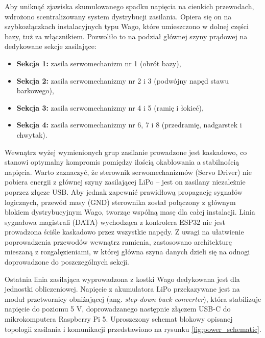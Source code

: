\documentclass[11pt]{extreport}
\begin{document}
Aby uniknąć zjawiska skumulowanego spadku napięcia na cienkich przewodach, wdrożono scentralizowany system dystrybucji zasilania. Opiera się on na szybkozłączkach instalacyjnych typu Wago, które umieszczono w dolnej części bazy, tuż za włącznikiem. Pozwoliło to na podział głównej szyny prądowej na dedykowane sekcje zasilające:
\begin{itemize}
    \item \textbf{Sekcja 1:} zasila serwomechanizm nr 1 (obrót bazy),
    \item \textbf{Sekcja 2:} zasila serwomechanizmy nr 2 i 3 (podwójny napęd stawu barkowego),
    \item \textbf{Sekcja 3:} zasila serwomechanizmy nr 4 i 5 (ramię i łokieć),
    \item \textbf{Sekcja 4:} zasila serwomechanizmy nr 6, 7 i 8 (przedramię, nadgarstek i chwytak).
\end{itemize}

Wewnątrz wyżej wymienionych grup zasilanie prowadzone jest kaskadowo, co stanowi optymalny kompromis pomiędzy ilością okablowania a stabilnością napięcia. Warto zaznaczyć, że sterownik serwomechanizmów (Servo Driver) nie pobiera energii z głównej szyny zasilającej LiPo -- jest on zasilany niezależnie poprzez złącze USB. Aby jednak zapewnić prawidłową propagację sygnałów logicznych, przewód masy (GND) sterownika został połączony z głównym blokiem dystrybucyjnym Wago, tworząc wspólną masę dla całej instalacji. Linia sygnałowa magistrali (DATA) wychodząca z kontrolera ESP32 nie jest prowadzona ściśle kaskadowo przez wszystkie napędy. Z uwagi na ułatwienie poprowadzenia przewodów wewnątrz ramienia, zastosowano architekturę mieszaną z rozgałęzieniami, w której główna szyna danych dzieli się na odnogi doprowadzone do poszczególnych sekcji.

Ostatnia linia zasilająca wyprowadzona z kostki Wago dedykowana jest dla jednostki obliczeniowej. Napięcie z akumulatora LiPo przekazywane jest na moduł przetwornicy obniżającej (ang. \textit{step-down buck converter}), która stabilizuje napięcie do poziomu 5 V, doprowadzanego następnie złączem USB-C do mikrokomputera Raspberry Pi 5. Uproszczony schemat blokowy opisanej topologii zasilania i komunikacji przedstawiono na rysunku \ref{fig:power_schematic}.
\end{document}
